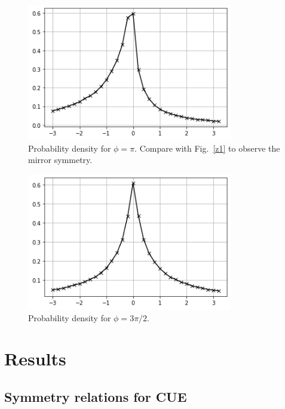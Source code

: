 \documentclass[twoside]{article}
\begin{document}
\begin{figure}
\centering
\includegraphics[width=0.8\textwidth]{3.png}
\caption[]{ 
  Probability density  for $\phi = \pi$. Compare with
 Fig.~\ref{z1} to observe the mirror symmetry.
  }
\vspace{1mm}
\label{z3}
\end{figure}

\begin{figure}
\centering
\includegraphics[width=0.8\textwidth]{4.png}
\caption[]{ 
  Probability density  for $\phi = 3\pi/2$. 
  }
\vspace{1mm}
\label{z4}
\end{figure}



\section{\label{sec3}Results}

\subsection{\label{sec3.1} Symmetry relations for CUE}
\end{document}
